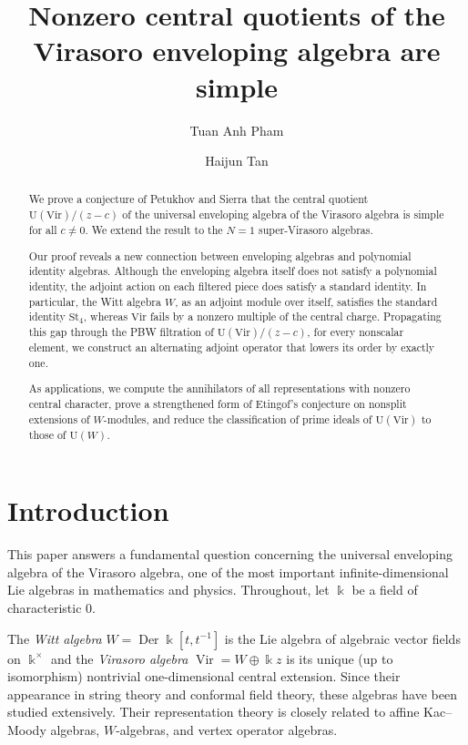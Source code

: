 \documentclass[12pt]{amsart}
\title[Central quotients of Virasoro-type enveloping algebras]{Nonzero central quotients of the Virasoro enveloping algebra are simple}
\author{Tuan Anh Pham}
\author{Haijun Tan}
\theoremstyle{plain}
\theoremstyle{definition}
\numberwithin{equation}{theorem}
\newcommand{\kk}{\Bbbk}
\newcommand{\Vir}{\operatorname{Vir}}
\newcommand{\Der}{\operatorname{Der}}
\begin{document}
\begin{abstract}
We prove a conjecture of Petukhov and Sierra that the central quotient $\mathrm{U}(\mathrm{Vir})/(z-c)$ of the universal enveloping algebra of the Virasoro algebra is simple for all $c \neq 0$. We extend the result to the $N=1$ super-Virasoro algebras.

Our proof reveals a new connection between enveloping algebras and polynomial identity algebras. Although the enveloping algebra itself does not satisfy a polynomial identity, the adjoint action on each filtered piece does satisfy a standard identity. In particular, the Witt algebra $W$, as an adjoint module over itself, satisfies the standard identity $\mathrm{St}_4$, whereas $\mathrm{Vir}$ fails by a nonzero multiple of the central charge. Propagating this gap through the PBW filtration of $\mathrm{U}(\mathrm{Vir})/(z-c)$, for every nonscalar element, we construct an alternating adjoint operator that lowers its order by exactly one.

As applications, we compute the annihilators of all representations with nonzero central character, prove a strengthened form of Etingof's conjecture on nonsplit extensions of $W$-modules, and reduce the classification of prime ideals of $\mathrm{U}(\mathrm{Vir})$ to those of $\mathrm{U}(W)$. 
\end{abstract}
\maketitle

\section{Introduction}

This paper answers a fundamental question concerning the universal enveloping algebra of the Virasoro algebra, one of the most important infinite-dimensional Lie algebras in mathematics and physics. Throughout, let $\kk$ be a field of characteristic $0$. 

The \emph{Witt algebra} $W = \Der \kk[t, t^{-1}]$ is the Lie algebra of algebraic vector fields on $\kk^\times$ and the \emph{Virasoro algebra} $\Vir = W \oplus \kk z$ is its unique (up to isomorphism) nontrivial one-dimensional central extension. Since their appearance in string theory and conformal field theory, these algebras have been studied extensively. Their representation theory is closely related to affine Kac--Moody algebras, $W$-algebras, and vertex operator algebras.
\end{document}
